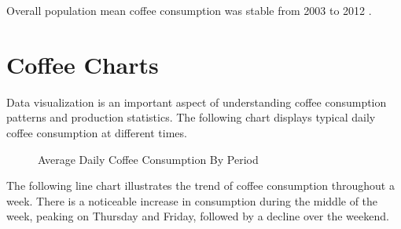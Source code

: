 \documentclass[thesis]{uofithesis} %
\begin{document}
Overall population mean coffee consumption was stable from 2003 to 2012
\cite{LOFTFIELD20161762}.

\chapter{Coffee Charts}

Data visualization is an important aspect of understanding coffee consumption 
patterns and production statistics. The following chart displays typical daily 
coffee consumption at different times.

\begin{figure}[H]
    \caption{Average Daily Coffee Consumption By Period}
    \medskip
    \label{fig:coffee_consumption_chart}
\end{figure}
\tagstructend
\bigskip

The following line chart illustrates the trend of coffee consumption throughout 
a week. There is a noticeable increase in consumption during the middle of the 
week, peaking on Thursday and Friday, followed by a decline over the weekend.
\end{document}
